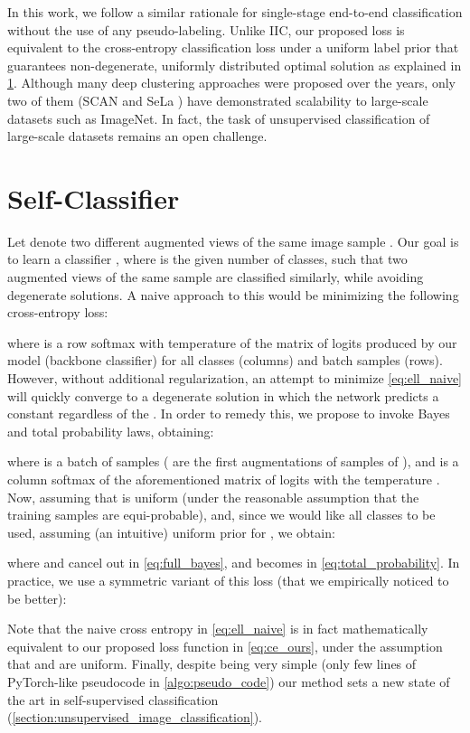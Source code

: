 \documentclass[runningheads]{llncs}
\begin{document}
In this work, we follow a similar rationale for single-stage end-to-end classification without the use of any pseudo-labeling. Unlike IIC, our proposed loss is equivalent to the cross-entropy classification loss under a uniform label prior that guarantees non-degenerate, uniformly distributed optimal solution as explained in \cref{section:self-classifier}. Although many deep clustering approaches were proposed over the years, only two of them (SCAN \cite{van2020scan} and SeLa \cite{YM.2020Self-labelling}) have demonstrated scalability to large-scale datasets such as ImageNet. In fact, the task of unsupervised classification of large-scale datasets remains an open challenge.


\section{Self-Classifier}
\label{section:self-classifier}
Let  denote two different augmented views of the same image sample . Our goal is to learn a classifier , where  is the given number of classes,
such that two augmented views of the same sample are classified similarly, while avoiding degenerate solutions. 
A naive approach to this would be minimizing the following cross-entropy loss:

where  is a row softmax with temperature  \cite{wu2018unsupervised} of the matrix of logits  produced by our model (backbone  classifier) for all classes (columns) and batch samples (rows). However, without additional regularization, an attempt to minimize \cref{eq:ell_naive} will quickly converge to a degenerate solution in which the network predicts a constant  regardless of the . In order to remedy this, we propose to invoke Bayes and total probability laws, obtaining:


where  is a batch of  samples ( are the first augmentations of samples of ), and  is a column softmax of the aforementioned matrix of logits  with the temperature . Now, assuming that  is uniform (under the reasonable assumption that the training samples are equi-probable), and, since we would like all classes to be used, assuming (an intuitive) uniform prior for , we obtain:

where  and  cancel out in \cref{eq:full_bayes}, and  becomes  in \cref{eq:total_probability}. In practice, we use a symmetric variant of this loss (that we empirically noticed to be better):

Note that the naive cross entropy in \cref{eq:ell_naive} is in fact mathematically equivalent to our proposed loss function in \cref{eq:ce_ours}, under the assumption that  and  are uniform. Finally, despite being very simple (only few lines of PyTorch-like pseudocode in \cref{algo:pseudo_code}) our method sets a new state of the art in self-supervised classification (\cref{section:unsupervised_image_classification}).
\end{document}
